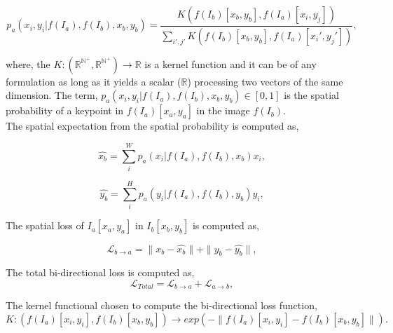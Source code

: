 \begin{equation}
    \label{eqn:spat_exp}
    p_a(x_i, y_i | f(I_a), f(I_b), x_b, y_b) = \dfrac{K(f(I_b)[x_b, y_b], f(I_a)[x_i, y_j])}{\displaystyle\sum_{i', j'}K(f(I_b)[x_b, y_b], f(I_a)[x_i', y_j'])},
\end{equation}

\noindent where, the $K:(\mathbb{R}^{\mathbb{N}^+}, \mathbb{R}^{\mathbb{N}^+}) \rightarrow \mathbb{R}$ is a kernel function and
it can be of any formulation as long as it yields a scalar ($\mathbb{R}$) processing two vectors of the same dimension.
The term, $p_a(x_i, y_i | f(I_a), f(I_b), x_b, y_b) \in [0, 1]$ is the spatial probability of a keypoint in $f(I_a)[x_a, y_a]$ in the image $f(I_b)$.\\

The spatial expectation from the spatial probability is computed as,

\begin{equation}
    \label{eqn:x_exp}
    \hat{x_b} = \displaystyle\sum_i^W p_a(x_i | f(I_a), f(I_b), x_b) x_i,
\end{equation}

\begin{equation}
    \label{eqn:y_exp}
    \hat{y_b} = \displaystyle\sum_i^H p_a(y_i| f(I_a), f(I_b), y_b) y_i,
\end{equation}

The spatial loss of $I_a[x_a, y_a]$ in $I_b[x_b, y_b]$ is computed as,

\begin{equation}
    \mathcal{L}_{b \rightarrow a} = \| x_b - \hat{x_b} \| + \| y_b - \hat{y_b} \|,
\end{equation}

The total bi-directional loss is computed as,
\begin{equation}
    \mathcal{L}_{Total} = \mathcal{L}_{b \rightarrow a} + \mathcal{L}_{a \rightarrow b},
\end{equation}

The kernel functional chosen to compute the bi-directional loss function,
\begin{equation}
    K: (f(I_a)[x_i, y_i], f(I_b)[x_b, y_b]) \rightarrow exp(-\|f(I_a)[x_i, y_i] - f(I_b)[x_b, y_b] \|).
\end{equation}

